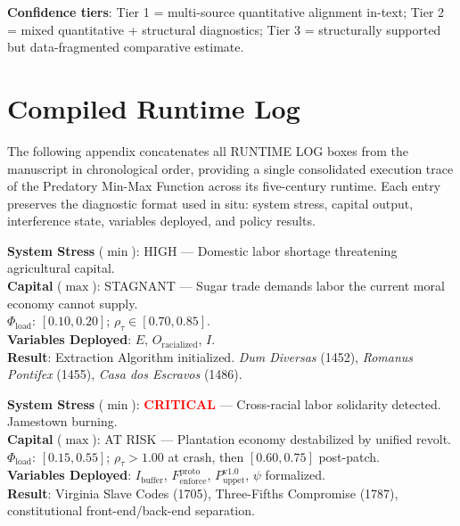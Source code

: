 \documentclass[12pt,openany]{book}
\begin{document}
\textbf{Confidence tiers}: Tier 1 = multi-source quantitative alignment in-text; Tier 2 = mixed quantitative + structural diagnostics; Tier 3 = structurally supported but data-fragmented comparative estimate.

\chapter{Compiled Runtime Log}
\label{sec:runtime_log}

The following appendix concatenates all RUNTIME LOG boxes from the manuscript in chronological order, providing a single consolidated execution trace of the Predatory Min-Max Function across its five-century runtime. Each entry preserves the diagnostic format used in situ: system stress, capital output, interference state, variables deployed, and policy results.

\bigskip

\begin{tcolorbox}[colback=black!5, colframe=black!70, fonttitle=\bfseries\ttfamily, title=1. RUNTIME LOG: 1486 (LISBON{,} PORTUGAL) \normalfont\small--- Chapter 2]
\ttfamily\small
\textbf{System Stress} ($\min$): HIGH --- Domestic labor shortage threatening agricultural capital.\\
\textbf{Capital} ($\max$): STAGNANT --- Sugar trade demands labor the current moral economy cannot supply.\\
\textbf{$\Phi_{\text{load}}$}: $[0.10, 0.20]$; $\rho_{\tau} \in [0.70, 0.85]$.\\
\textbf{Variables Deployed}: $E$, $O_{\text{racialized}}$, $I$.\\
\textbf{Result}: Extraction Algorithm initialized. \textit{Dum Diversas} (1452), \textit{Romanus Pontifex} (1455), \textit{Casa dos Escravos} (1486).
\end{tcolorbox}

\begin{tcolorbox}[colback=black!5, colframe=black!70, fonttitle=\bfseries\ttfamily, title=2. RUNTIME LOG: 1676--1787 (VIRGINIA $\rightarrow$ PHILADELPHIA) \normalfont\small--- Chapter 3]
\ttfamily\small
\textbf{System Stress} ($\min$): \textcolor{red}{\textbf{CRITICAL}} --- Cross-racial labor solidarity detected. Jamestown burning.\\
\textbf{Capital} ($\max$): AT RISK --- Plantation economy destabilized by unified revolt.\\
\textbf{$\Phi_{\text{load}}$}: $[0.15, 0.55]$; $\rho_{\tau}>1.00$ at crash, then $[0.60, 0.75]$ post-patch.\\
\textbf{Variables Deployed}: $I_{\text{buffer}}$, $F_{\text{enforce}}^{\text{proto}}$, $P_{\text{uppet}}^{\text{v1.0}}$, $\psi$ formalized.\\
\textbf{Result}: Virginia Slave Codes (1705), Three-Fifths Compromise (1787), constitutional front-end/back-end separation.
\end{tcolorbox}
\end{document}
